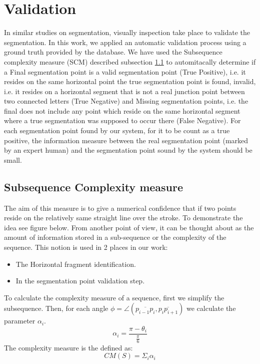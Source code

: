 \documentclass[journal,compsoc]{IEEEtran}
\begin{document}
\section{Validation}
\label{sec:validation}
In similar studies on segmentation, visually inspection take place to validate the segmentation. In this work, we applied an automatic validation process using a ground truth provided by the database. We have used the Subsequence complexity measure (SCM) described subsection \ref{subsec:scm} to automitacally determine if a Final segmentation point is a valid segmentation point (True Positive), i.e. it resides on the same horizontal point the true segmentation point is found, invalid, i.e. it resides on a horizontal segment that is not a real junction point between two connected letters (True Negative) and Missing segmentation points, i.e. the final does not include any point which reside on the same horizontal segment where a true segmentation was supposed to occur there (False Negative).  
For each segmentation point found by our system, for it to be count as a true positive, the information measure between the real segmentation point (marked by an expert human) and the segmentation point sound by the system should be small.

\subsection{Subsequence Complexity measure }
\label{subsec:scm}
The aim of this measure is to give a numerical confidence that if two points reside on the relatively same straight line over the stroke. To demonstrate the idea see figure below. From another point of view, it can be thought about as the amount of information stored in a sub-sequence or the complexity of the sequence. This notion is used in 2 places in our work:
\begin{itemize}
\item The Horizontal fragment identification.
\item In the segmentation point validation step.
\end{itemize}

To calculate the complexity measure of a sequence, first we simplify the subsequence. Then, for each angle  $\phi=\angle(\overline{p_{i-1}p_{i}},\overline{p_{i}p_{i+1}})$ we calculate the parameter $\alpha_{i}$.
\begin{equation}
 \alpha_{i}=\frac{\pi-\theta_{i}}{\frac{\pi}{6}}
\end{equation}
The complexity measure is the defined as:
\begin{equation}
CM(S)=\Sigma_{i}\alpha_{i}
\end{equation}
\end{document}
